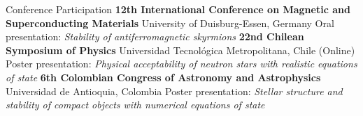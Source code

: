 \begin{rubric}{Conference Participation}
\textbf{12th International Conference on Magnetic and Superconducting Materials} \newline
University of Duisburg-Essen, Germany \newline
Oral presentation: \emph{Stability of antiferromagnetic skyrmions}
\textbf{22nd Chilean Symposium of Physics} \newline
Universidad Tecnológica Metropolitana, Chile (Online) \newline
Poster presentation: \emph{Physical acceptability of neutron stars with realistic equations of state}
%
\textbf{6th Colombian Congress of Astronomy and Astrophysics} \newline
Universidad de Antioquia, Colombia \newline
Poster presentation: \emph{Stellar structure and stability of compact objects with numerical equations of state}
\end{rubric}